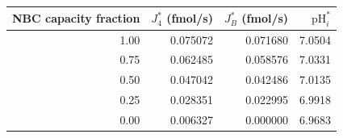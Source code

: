 \begin{tabular}{rrrr}
\toprule
NBC capacity fraction & $J_4^*$ (fmol/s) & $J_B^*$ (fmol/s) & $\mathrm{pH}_i^*$ \\
\midrule
1.00 & 0.075072 & 0.071680 & 7.0504 \\
0.75 & 0.062485 & 0.058576 & 7.0331 \\
0.50 & 0.047042 & 0.042486 & 7.0135 \\
0.25 & 0.028351 & 0.022995 & 6.9918 \\
0.00 & 0.006327 & 0.000000 & 6.9683 \\
\bottomrule
\end{tabular}
